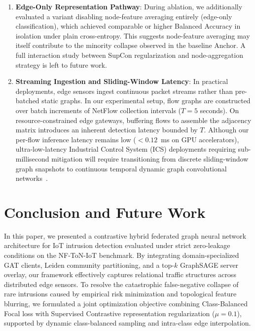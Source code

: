 \documentclass[journal,onecolumn]{IEEEtran}
\begin{document}
\begin{enumerate}
    \item \textbf{Edge-Only Representation Pathway}: During ablation, we additionally evaluated a variant disabling node-feature averaging entirely (edge-only classification), which achieved comparable or higher Balanced Accuracy in isolation under plain cross-entropy. This suggests node-feature averaging may itself contribute to the minority collapse observed in the baseline Anchor. A full interaction study between SupCon regularization and node-aggregation strategy is left to future work.
    \item \textbf{Streaming Ingestion and Sliding-Window Latency}: In practical deployments, edge sensors ingest continuous packet streams rather than pre-batched static graphs. In our experimental setup, flow graphs are constructed over batch increments of NetFlow collection intervals ($T = 5$ seconds). On resource-constrained edge gateways, buffering flows to assemble the adjacency matrix introduces an inherent detection latency bounded by $T$. Although our per-flow inference latency remains low ($< 0.12$~ms on GPU accelerators), ultra-low-latency Industrial Control System (ICS) deployments requiring sub-millisecond mitigation will require transitioning from discrete sliding-window graph snapshots to continuous temporal dynamic graph convolutional networks~\cite{rossi2020tgn}.
\end{enumerate}

\section{Conclusion and Future Work}
\label{sec:conclusion}

In this paper, we presented a contrastive hybrid federated graph neural network architecture for IoT intrusion detection evaluated under strict zero-leakage conditions on the NF-ToN-IoT benchmark. By integrating domain-specialized GAT clients, Leiden community partitioning, and a top-$k$ GraphSAGE server overlay, our framework effectively captures relational traffic structures across distributed edge sensors. To resolve the catastrophic false-negative collapse of rare intrusions caused by empirical risk minimization and topological feature blurring, we formulated a joint optimization objective combining Class-Balanced Focal loss with Supervised Contrastive representation regularization ($\mu = 0.1$), supported by dynamic class-balanced sampling and intra-class edge interpolation.
\end{document}
